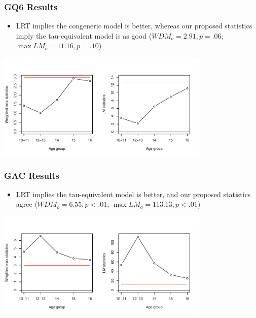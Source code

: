 \documentclass{beamer}
\begin{document}
\begin{frame}[fragile]
  \frametitle{GQ6 Results}
  \begin{itemize}
    \item LRT implies the congeneric model is better, whereas our
      proposed statistics imply the tau-equivalent model is as good
      ($WDM_{o}=2.91, p=.06$; $\max LM_o = 11.16, p=.10$)
  \end{itemize}
  \begin{center}
      \includegraphics[height=2in]{ordinal-gq6res.pdf}
  \end{center}
\end{frame}

\begin{frame}[fragile]
  \frametitle{GAC Results}
  \begin{itemize}
    \item LRT implies the tau-equivalent model is better, and our
      proposed statistics agree ($WDM_{o}=6.55, p<.01$; $\max LM_o =
      113.13, p<.01$)
  \end{itemize}
  \begin{center}
      \includegraphics[height=2in]{ordinal-gacres.pdf}
  \end{center}
\end{frame}
\end{document}
